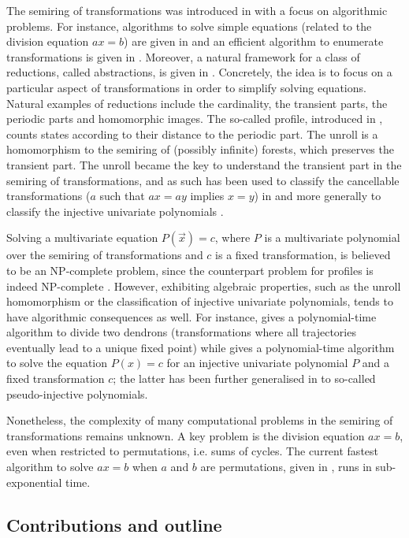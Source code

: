 \documentclass[a4paper, 11pt]{article}
\theoremstyle{plain}
\theoremstyle{definition}
\begin{document}
The semiring of transformations was introduced in \cite{DDFMP18} with a focus on algorithmic problems. For instance, algorithms to solve simple equations (related to the division equation $ax = b$) are given in \cite{DFMMR19, FRR21, BCDR24, DFMR24} and an efficient algorithm to enumerate transformations is given in \cite{DPT24}. Moreover, a natural framework for a class of reductions, called abstractions, is given in \cite{Riv22}. Concretely, the idea is to focus on a particular aspect of transformations in order to simplify solving equations. Natural examples of reductions include the cardinality, the transient parts, the periodic parts and homomorphic images. The so-called profile, introduced in \cite{Gaz20}, counts states according to their distance to the periodic part. The unroll \cite{NG24} is a homomorphism to the semiring of (possibly infinite) forests, which preserves the transient part. The unroll became the key to understand the transient part in the semiring of transformations, and as such has been used to classify the cancellable transformations ($a$ such that $ax = ay$ implies $x = y$) in \cite{NG24} and more generally to classify the injective univariate polynomials \cite{PR25CiE}.

Solving a multivariate equation $P(\vec{x}) = c$, where $P$ is a multivariate polynomial over the semiring of transformations and $c$ is a fixed transformation, is believed to be an NP-complete problem, since the counterpart problem for profiles is indeed NP-complete \cite{Gaz20}. However, exhibiting algebraic properties, such as the unroll homomorphism or the classification of injective univariate polynomials, tends to have algorithmic consequences as well. For instance, \cite{NG24} gives a polynomial-time algorithm to divide two dendrons (transformations where all trajectories eventually lead to a unique fixed point) while \cite{PR25CiE} gives a polynomial-time algorithm to solve the equation $P( x ) = c$ for an injective univariate polynomial $P$ and a fixed transformation $c$; the latter has been further generalised in \cite{PR25A} to so-called pseudo-injective polynomials.

Nonetheless, the complexity of many computational problems in the semiring of transformations remains unknown. A key problem is the division equation $ax = b$, even when restricted to permutations, i.e. sums of cycles. The current fastest algorithm to solve $ax = b$ when $a$ and $b$ are permutations, given in \cite{BCDR24}, runs in sub-exponential time.


\subsection{Contributions and outline} \label{subsection:contributions}
\end{document}
